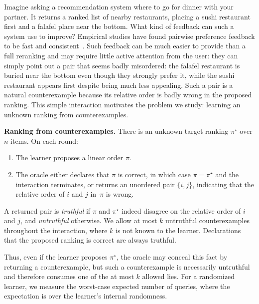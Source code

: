 \documentclass[11pt]{article}
\theoremstyle{definition}
\theoremstyle{remark}
\begin{document}
Imagine asking a recommendation system where to go for dinner with your
partner. It returns a ranked list of nearby restaurants, placing a sushi
restaurant first and a falafel place near the bottom. What kind of feedback can such a system use to improve? Empirical studies have found pairwise preference feedback to be fast and consistent~\cite{CarteretteEtAl2008,ShahEtAl2014}. Such feedback can be much easier to provide than a full reranking and may require little active attention from the user: they can simply point out a pair that seems badly misordered: the falafel restaurant is
buried near the bottom even though they strongly prefer it, while the sushi
restaurant appears first despite being much less appealing. 
Such a pair is
a natural counterexample because its relative order is badly wrong in the
proposed ranking. 
This simple interaction motivates the problem we study:
learning an unknown ranking from counterexamples.
\medskip
\begin{modelbox}
\textbf{Ranking from counterexamples.}
There is an unknown target ranking $\pi^\star$ over $n$ items. On each round:

\begin{enumerate}[leftmargin=22pt,itemsep=2pt,topsep=4pt]
    \item The learner proposes a linear order $\pi$.
    \item The oracle either declares that $\pi$ is correct, in which case
    $\pi=\pi^\star$ and the interaction terminates, or returns an unordered
    pair $\{i,j\}$, indicating that the relative order of $i$
    and $j$ in~$\pi$ is wrong.
\end{enumerate}
A returned pair is \emph{truthful} if $\pi$ and $\pi^\star$ indeed disagree on the relative order of $i$ and $j$, and \emph{untruthful} otherwise. We allow at most $k$ untruthful counterexamples throughout the interaction, where $k$ is not known to the learner. Declarations that the proposed ranking is correct are always truthful.
\end{modelbox}
Thus, even if the learner proposes $\pi^\star$, the oracle may conceal this
fact by returning a counterexample, but such a counterexample is necessarily
untruthful and therefore consumes one of the at most $k$ allowed lies.
For a randomized learner, we measure the worst-case expected number of
queries, where the expectation is over the learner's internal randomness.
\medskip
\end{document}
